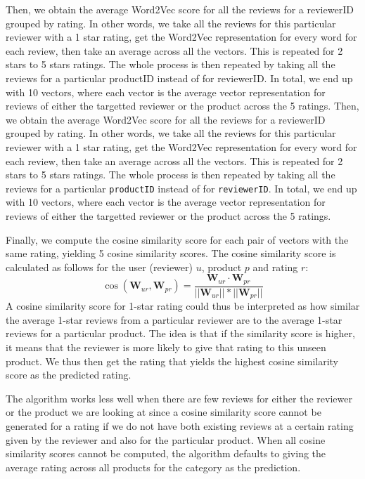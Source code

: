 \documentclass[sigconf,authorversion,nonacm]{acmart}
\begin{document}
Then, we obtain the average Word2Vec score for all the reviews for a reviewerID grouped by rating. In other words, we take all the reviews for this particular reviewer with a 1 star rating, get the Word2Vec representation for every word for each review, then take an average across all the vectors. This is repeated for 2 stars to 5 stars ratings. The whole process is then repeated by taking all the reviews for a particular productID instead of for reviewerID. In total, we end up with 10 vectors, where each vector is the average vector representation for reviews of either the targetted reviewer or the product across the 5 ratings. 
Then, we obtain the average Word2Vec score for all the reviews for a reviewerID grouped by rating. In other words, we take all the reviews for this particular reviewer with a 1 star rating, get the Word2Vec representation for every word for each review, then take an average across all the vectors. This is repeated for 2 stars to 5 stars ratings. The whole process is then repeated by taking all the reviews for a particular \verb|productID| instead of for \verb|reviewerID|. In total, we end up with 10 vectors, where each vector is the average vector representation for reviews of either the targetted reviewer or the product across the 5 ratings. 

Finally, we compute the cosine similarity score for each pair of vectors with the same rating, yielding 5 cosine similarity scores. The cosine similarity score is calculated as follows for the user (reviewer) $u$, product $p$ and rating $r$: 
$$ \cos ({\textbf{W}_{ur}}, {\textbf{W}_{pr}}) = \dfrac {\textbf{W}_{ur} \cdot \textbf{W}_{pr}} {||\textbf{W}_{ur}|| * ||\textbf{W}_{pr}||} $$
A cosine similarity score for 1-star rating could thus be interpreted as how similar the average 1-star reviews from a particular reviewer are to the average 1-star reviews for a particular product. The idea is that if the similarity score is higher, it means that the reviewer is more likely to give that rating to this unseen product. We thus then get the rating that yields the highest cosine similarity score as the predicted rating. 

The algorithm works less well when there are few reviews for either the reviewer or the product we are looking at since a cosine similarity score cannot be generated for a rating if we do not have both existing reviews at a certain rating given by the reviewer and also for the particular product. When all cosine similarity scores cannot be computed, the algorithm defaults to giving the average rating across all products for the category as the prediction. 
\end{document}
